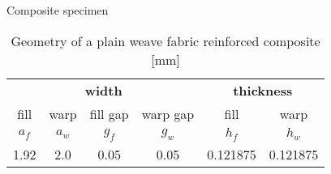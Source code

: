 \documentclass[10pt,aspectratio=169,dvipsnames]{beamer} %
\begin{document}
	\begin{frame}{Composite specimen}
		\begin{table}[h]
			\renewcommand{\arraystretch}{1.1}
			\centering \footnotesize
			\caption{Geometry of a plain weave fabric reinforced composite [mm]}
			\begin{tabular}{cccccc} 
				\toprule[1.5pt]
				\multicolumn{4}{c}{\textbf{width} }	& \multicolumn{2}{c}{\textbf{thickness} }\\ 
				\cmidrule(lr){1-4} \cmidrule(lr){5-6} 
				fill & warp & fill gap& warp gap& fill & warp\\
				$a_f$ &$a_w$& $g_f$ & $g_w$ & $h_f$& $h_w$ \\ 
				\cmidrule(lr){1-2} \cmidrule(lr){3-4} \cmidrule(lr){5-6}
				1.92 &2.0& 0.05& 0.05 & 0.121875 & 0.121875 \\
				\bottomrule[1.5pt] 
			\end{tabular} 
			\label{tab:weave_geo}
		\end{table}
	\end{frame}
\end{document}
